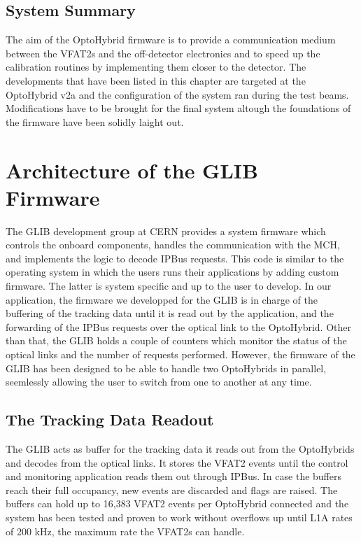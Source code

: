       \subsection{System Summary}

        The aim of the OptoHybrid firmware is to provide a communication medium between the VFAT2s and the off-detector electronics and to speed up the calibration routines by implementing them closer to the detector. The developments that have been listed in this chapter are targeted at the OptoHybrid v2a and the configuration of the system ran during the test beams. Modifications have to be brought for the final system altough the foundations of the firmware have been solidly laight out.

  \section{Architecture of the GLIB Firmware}

    The GLIB development group at CERN provides a system firmware which controls the onboard components, handles the communication with the MCH, and implements the logic to decode IPBus requests. This code is similar to the operating system in which the users runs their applications by adding custom firmware. The latter is system specific and up to the user to develop. In our application, the firmware we developped for the GLIB is in charge of the buffering of the tracking data until it is read out by the application, and the forwarding of the IPBus requests over the optical link to the OptoHybrid. Other than that, the GLIB holds a couple of counters which monitor the status of the optical links and the number of requests performed. However, the firmware of the GLIB has been designed to be able to handle two OptoHybrids in parallel, seemlessly allowing the user to switch from one to another at any time.

    \subsection{The Tracking Data Readout}

      The GLIB acts as buffer for the tracking data it reads out from the OptoHybrids and decodes from the optical links. It stores the VFAT2 events until the control and monitoring application reads them out through IPBus. In case the buffers reach their full occupancy, new events are discarded and flags are raised. The buffers can hold up to 16,383 VFAT2 events per OptoHybrid connected and the system has been tested and proven to work without overflows up until L1A rates of 200 kHz, the maximum rate the VFAT2s can handle.

